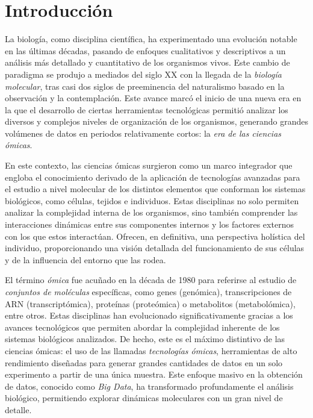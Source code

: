 \chapter{Introducción}

La biología, como disciplina científica, ha experimentado una evolución notable en las últimas décadas, 
pasando de enfoques cualitativos y descriptivos a un análisis más detallado y cuantitativo de los organismos 
vivos. Este cambio de paradigma se produjo a mediados del siglo XX con la llegada de la \textit{biología molecular},
tras casi dos siglos de preeminencia del naturalismo basado en la observación y la contemplación. 
Este avance marcó el inicio de una nueva era en la que el desarrollo de ciertas herramientas tecnológicas permitió 
analizar los diversos y complejos niveles de organización de los organismos, generando grandes volúmenes de datos 
en periodos relativamente cortos: la \textit{era de las ciencias ómicas}\cite{referencia-1}\cite{referencia-2}. \newline%

En este contexto, las ciencias ómicas surgieron como un marco integrador que engloba el conocimiento derivado 
de la aplicación de tecnologías avanzadas para el estudio a nivel molecular de los distintos elementos que 
conforman los sistemas biológicos, como células, tejidos e individuos. Estas disciplinas no solo permiten 
analizar la complejidad interna de los organismos, sino también comprender las interacciones dinámicas 
entre sus componentes internos y los factores externos con los que estos interactúan. Ofrecen, en definitiva,
una perspectiva holística del individuo, proporcionando una visión detallada del funcionamiento de sus células 
y de la influencia del entorno que las rodea\cite{referencia-2}. \newline%

El término \textit{ómica} fue acuñado en la década de 1980 para referirse al estudio de 
\textit{conjuntos de moléculas} específicas, como genes (genómica), transcripciones de ARN (transcriptómica), 
proteínas (proteómica) o metabolitos (metabolómica), entre otros. Estas disciplinas han evolucionado 
significativamente gracias a los avances tecnológicos que permiten abordar la complejidad inherente de los 
sistemas biológicos analizados. De hecho, este es el máximo distintivo de las ciencias ómicas: el uso de las 
llamadas \textit{tecnologías ómicas}, herramientas de alto rendimiento diseñadas para generar grandes cantidades 
de datos en un solo experimento a partir de una única muestra. Este enfoque masivo en la obtención de datos, 
conocido como \textit{Big Data}, ha transformado profundamente el análisis biológico, permitiendo explorar 
dinámicas moleculares con un gran nivel de detalle.\cite{referencia-2}\cite{referencia-5}\newline%

